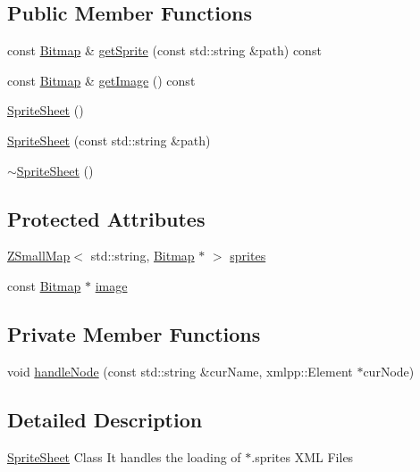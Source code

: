 \subsection*{Public Member Functions}
\begin{DoxyCompactItemize}
\item 
const \hyperlink{classZeta_1_1Bitmap}{Bitmap} \& \hyperlink{classZeta_1_1SpriteSheet_aa57c119e462b4ab2267a86e7efa3c2a8}{get\+Sprite} (const std\+::string \&path) const 
\item 
const \hyperlink{classZeta_1_1Bitmap}{Bitmap} \& \hyperlink{classZeta_1_1SpriteSheet_abfef12fc599bdd29ebbe9e03fbb78ab2}{get\+Image} () const 
\item 
\hyperlink{classZeta_1_1SpriteSheet_aa6c5c8d15d657a611b8a456769b1a627}{Sprite\+Sheet} ()
\item 
\hyperlink{classZeta_1_1SpriteSheet_aebfc743153a89951225edfd2c65ba525}{Sprite\+Sheet} (const std\+::string \&path)
\item 
\hyperlink{classZeta_1_1SpriteSheet_a1b27eccbe11e3056d284e4e531c2cc42}{$\sim$\+Sprite\+Sheet} ()
\end{DoxyCompactItemize}
\subsection*{Protected Attributes}
\begin{DoxyCompactItemize}
\item 
\hyperlink{namespaceZeta_a4c11e23ddc559dccdb5e85901d7dfb84}{Z\+Small\+Map}$<$ std\+::string, \hyperlink{classZeta_1_1Bitmap}{Bitmap} $\ast$ $>$ \hyperlink{classZeta_1_1SpriteSheet_a2420b47ed8881c5140278fa8687b4e22}{sprites}
\item 
const \hyperlink{classZeta_1_1Bitmap}{Bitmap} $\ast$ \hyperlink{classZeta_1_1SpriteSheet_aadb38736b2c4b9901102934a7fd2498e}{image}
\end{DoxyCompactItemize}
\subsection*{Private Member Functions}
\begin{DoxyCompactItemize}
\item 
void \hyperlink{classZeta_1_1SpriteSheet_afdd3a14d8aab2b78eb47c112ac6281f9}{handle\+Node} (const std\+::string \&cur\+Name, xmlpp\+::\+Element $\ast$cur\+Node)
\end{DoxyCompactItemize}


\subsection{Detailed Description}
\hyperlink{classZeta_1_1SpriteSheet}{Sprite\+Sheet} Class It handles the loading of $\ast$.sprites X\+M\+L Files 

